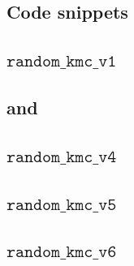 \documentclass[b5paper]{report}
\begin{document}
\begin{appendices}


\chapter{Code snippets}
\label{apx:code}

\section{\texorpdfstring{$\texttt{random\_kmc\_v1}$}{random\_kmc\_v1}}
\label{apx:randkmcv1}

\section{\texorpdfstring{ and }{random\_kmc\_v2 and random\_kmc\_v3}}
\label{apx:randkmcv2}

\section{\texorpdfstring{$\texttt{random\_kmc\_v4}$}{random\_kmc\_v4}}
\label{apx:randkmcv4}

\section{\texorpdfstring{$\texttt{random\_kmc\_v5}$}{random\_kmc\_v5}}
\label{apx:randkmcv5}

\section{\texorpdfstring{$\texttt{random\_kmc\_v6}$}{random\_kmc\_v6}}
\label{apx:randkmcv6}


\end{appendices}
\end{document}
